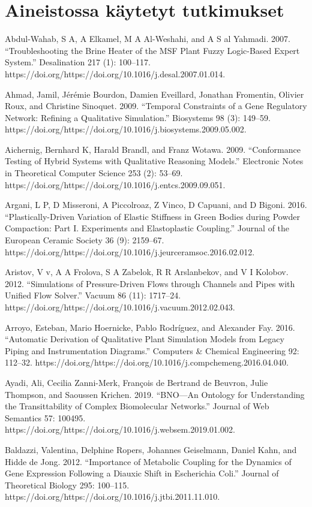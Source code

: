 \documentclass[utf8]{gradu3}
\begin{document}
\appendix
\section{Aineistossa käytetyt tutkimukset}

Abdul-Wahab, S A, A Elkamel, M A Al-Weshahi, and A S al Yahmadi. 2007. “Troubleshooting the Brine Heater of the MSF Plant Fuzzy Logic-Based Expert System.” Desalination 217 (1): 100–117. https://doi.org/https://doi.org/10.1016/j.desal.2007.01.014.

Ahmad, Jamil, Jérémie Bourdon, Damien Eveillard, Jonathan Fromentin, Olivier Roux, 
and Christine Sinoquet. 2009. 
“Temporal Constraints of a Gene Regulatory Network: 
Refining a Qualitative Simulation.” Biosystems 98 (3): 149–59.
https://doi.org/https://doi.org/10.1016/j.biosystems.2009.05.002.

Aichernig, Bernhard K, Harald Brandl, and Franz Wotawa. 2009. “Conformance Testing of Hybrid Systems with Qualitative Reasoning Models.” Electronic Notes in Theoretical Computer Science 253 (2): 53–69. https://doi.org/https://doi.org/10.1016/j.entcs.2009.09.051.

Argani, L P, D Misseroni, A Piccolroaz, Z Vinco, D Capuani, and D Bigoni. 2016. “Plastically-Driven Variation of Elastic Stiffness in Green Bodies during Powder Compaction: Part I. Experiments and Elastoplastic Coupling.” Journal of the European Ceramic Society 36 (9): 2159–67. https://doi.org/https://doi.org/10.1016/j.jeurceramsoc.2016.02.012.

Aristov, V v, A A Frolova, S A Zabelok, R R Arslanbekov, and V I Kolobov. 2012. “Simulations of Pressure-Driven Flows through Channels and Pipes with Unified Flow Solver.” Vacuum 86 (11): 1717–24. https://doi.org/https://doi.org/10.1016/j.vacuum.2012.02.043.

Arroyo, Esteban, Mario Hoernicke, Pablo Rodríguez, and Alexander Fay. 2016. “Automatic Derivation of Qualitative Plant Simulation Models from Legacy Piping and Instrumentation Diagrams.” Computers \& Chemical Engineering 92: 112–32. https://doi.org/https://doi.org/10.1016/j.compchemeng.2016.04.040.

Ayadi, Ali, Cecilia Zanni-Merk, François de Bertrand de Beuvron, Julie Thompson, and Saoussen Krichen. 2019. “BNO—An Ontology for Understanding the Transittability of Complex Biomolecular Networks.” Journal of Web Semantics 57: 100495. https://doi.org/https://doi.org/10.1016/j.websem.2019.01.002.

Baldazzi, Valentina, Delphine Ropers, Johannes Geiselmann, Daniel Kahn, and Hidde de Jong. 2012. “Importance of Metabolic Coupling for the Dynamics of Gene Expression Following a Diauxic Shift in Escherichia Coli.” Journal of Theoretical Biology 295: 100–115. https://doi.org/https://doi.org/10.1016/j.jtbi.2011.11.010.
\end{document}
